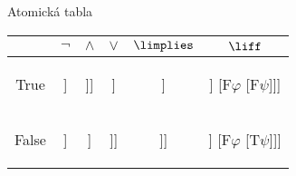 \documentclass{beamer}
\begin{document}
\begin{frame}{Atomická tabla}

        \begin{tabular}{@{}c||c|c|c|c|c@{}}
         & $\neg$ & $\land$ & $\lor$ & $\limplies$ & $\liff$  \\ \midrule \midrule
        True
        &  
        \begin{forest}
        [$\mathrm{T}\neg\varphi$ [$\mathrm{F}\varphi$]]
        \end{forest}
        &  
        \begin{forest}
        [$\mathrm{T}\varphi\land\psi$ [$\mathrm{T}\varphi$ [$\mathrm{T}\psi$]]]
        \end{forest}
        & 
        \begin{forest}
        [$\mathrm{T}\varphi\lor\psi$ [$\mathrm{T}\varphi$] [$\mathrm{T}\psi$]]
        \end{forest}
        &
        \begin{forest}
        [$\mathrm{T}\varphi\limplies\psi$ [$\mathrm{F}\varphi$] [$\mathrm{T}\psi$]]
        \end{forest}
        &  
        \begin{forest}
        [$\mathrm{T}\varphi\liff\psi$ [$\mathrm{T}\varphi$ [$\mathrm{T}\psi$]] [$\mathrm{F}\varphi$ [$\mathrm{F}\psi$]]]
        \end{forest}
        \\ \midrule
        False 
        & 
        \begin{forest}
        [$\mathrm{F}\neg\varphi$ [$\mathrm{T}\varphi$]]
        \end{forest}
        &
        \begin{forest}
        [$\mathrm{F}\varphi\land\psi$ [$\mathrm{F}\varphi$] [$\mathrm{F}\psi$]]
        \end{forest}
        &
        \begin{forest}
        [$\mathrm{F}\varphi\lor\psi$ [$\mathrm{F}\varphi$ [$\mathrm{F}\psi$]]]
        \end{forest}
        &
        \begin{forest}
        [$\mathrm{F}\varphi\limplies\psi$ [$\mathrm{T}\varphi$ [$\mathrm{F}\psi$]]]
        \end{forest}
        &
        \begin{forest}
        [$\mathrm{F}\varphi\liff\psi$ [$\mathrm{T}\varphi$ [$\mathrm{F}\psi$]] [$\mathrm{F}\varphi$ [$\mathrm{T}\psi$]]]
        \end{forest}
        \end{tabular}
    
\end{frame}
\end{document}
